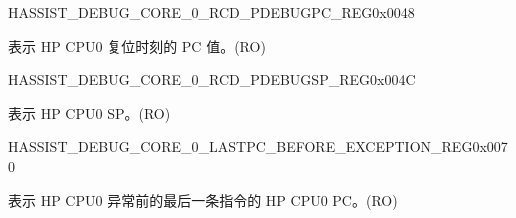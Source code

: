 \begin{register}{H}{ASSIST\_DEBUG\_CORE\_0\_RCD\_PDEBUGPC\_REG}{0x0048}\label{regdesc:ASSISTDEBUGCORE0RCDPDEBUGPCREG}
%
\regnewline%
\begin{regdesc}\begin{reglist}
\label{fielddesc:ASSISTDEBUGCORE0RCDPDEBUGPC}\item [ASSIST\_DEBUG\_CORE\_0\_RCD\_PDEBUGPC] 表示 HP CPU0 复位时刻的 PC 值。(RO)
\end{reglist}\end{regdesc}
\end{register}


\begin{register}{H}{ASSIST\_DEBUG\_CORE\_0\_RCD\_PDEBUGSP\_REG}{0x004C}\label{regdesc:ASSISTDEBUGCORE0RCDPDEBUGSPREG}
%
\regnewline%
\begin{regdesc}\begin{reglist}
\label{fielddesc:ASSISTDEBUGCORE0RCDPDEBUGSP}\item [ASSIST\_DEBUG\_CORE\_0\_RCD\_PDEBUGSP] 表示 HP CPU0 SP。(RO)
\end{reglist}\end{regdesc}
\end{register}


\begin{register}{H}{ASSIST\_DEBUG\_CORE\_0\_LASTPC\_BEFORE\_EXCEPTION\_REG}{0x0070}\label{regdesc:ASSISTDEBUGCORE0LASTPCBEFOREEXCEPTIONREG}
%
\regnewline%
\begin{regdesc}\begin{reglist}
\label{fielddesc:ASSISTDEBUGCORE0LASTPCBEFOREEXC}\item [ASSIST\_DEBUG\_CORE\_0\_LASTPC\_BEFORE\_EXC] 表示 HP CPU0 异常前的最后一条指令的 HP CPU0 PC。(RO)
\end{reglist}\end{regdesc}
\end{register}


